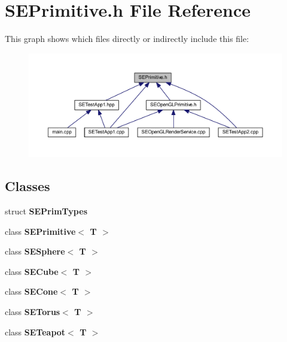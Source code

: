 \section{S\+E\+Primitive.\+h File Reference}
\label{_s_e_primitive_8h}
This graph shows which files directly or indirectly include this file\+:
\nopagebreak
\begin{figure}[H]
\begin{center}
\leavevmode
\includegraphics[width=350pt]{_s_e_primitive_8h__dep__incl}
\end{center}
\end{figure}
\subsection*{Classes}
\begin{DoxyCompactItemize}
\item 
struct {\bf S\+E\+Prim\+Types}
\item 
class {\bf S\+E\+Primitive$<$ T $>$}
\item 
class {\bf S\+E\+Sphere$<$ T $>$}
\item 
class {\bf S\+E\+Cube$<$ T $>$}
\item 
class {\bf S\+E\+Cone$<$ T $>$}
\item 
class {\bf S\+E\+Torus$<$ T $>$}
\item 
class {\bf S\+E\+Teapot$<$ T $>$}
\end{DoxyCompactItemize}
